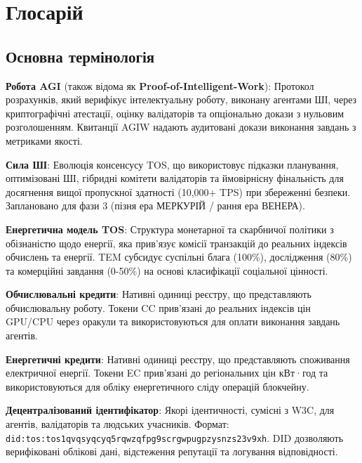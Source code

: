 \documentclass[11pt]{article}
\begin{document}
\clearpage

\section*{Глосарій}

\subsection*{Основна термінологія}

\begin{description}[leftmargin=3cm, style=nextline]
  \item[AGIW (PoIW)] \textbf{Робота AGI} (також відома як \textbf{Proof-of-Intelligent-Work}): Протокол розрахунків, який верифікує інтелектуальну роботу, виконану агентами ШІ, через криптографічні атестації, оцінку валідаторів та опціонально докази з нульовим розголошенням. Квитанції AGIW надають аудитовані докази виконання завдань з метриками якості.

  \item[PAI] \textbf{Сила ШІ}: Еволюція консенсусу TOS, що використовує підказки планування, оптимізовані ШІ, гібридні комітети валідаторів та ймовірнісну фінальність для досягнення вищої пропускної здатності (10,000+ TPS) при збереженні безпеки. Заплановано для фази 3 (пізня ера МЕРКУРІЙ / рання ера ВЕНЕРА).

  \item[TEM] \textbf{Енергетична модель TOS}: Структура монетарної та скарбничої політики з обізнаністю щодо енергії, яка прив'язує комісії транзакцій до реальних індексів обчислень та енергії. TEM субсидує суспільні блага (100\%), дослідження (80\%) та комерційні завдання (0-50\%) на основі класифікації соціальної цінності.

  \item[CC] \textbf{Обчислювальні кредити}: Нативні одиниці реєстру, що представляють обчислювальну роботу. Токени CC прив'язані до реальних індексів цін GPU/CPU через оракули та використовуються для оплати виконання завдань агентів.

  \item[EC] \textbf{Енергетичні кредити}: Нативні одиниці реєстру, що представляють споживання електричної енергії. Токени EC прив'язані до регіональних цін кВт·год та використовуються для обліку енергетичного сліду операцій блокчейну.

  \item[DID] \textbf{Децентралізований ідентифікатор}: Якорі ідентичності, сумісні з W3C, для агентів, валідаторів та людських учасників. Формат: \texttt{did:tos:tos1qvqsyqcyq5rqwzqfpg9scrgwpugpzysnzs23v9xh}. DID дозволяють верифіковані облікові дані, відстеження репутації та логування відповідності.


\end{description}
\end{document}
